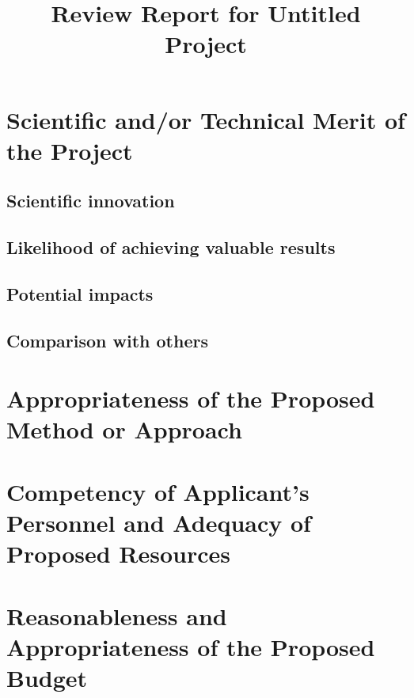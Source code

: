 \documentclass[11pt,a4paper,final]{article}
\title{Review Report for Untitled Project}
\date{}
\begin{document}
\maketitle

\section{Scientific and/or Technical Merit of the Project}

\begin{mdframed}
\subsection{Scientific innovation}

\subsection{Likelihood of achieving valuable results}

\subsection{Potential impacts}

\subsection{Comparison with others}

\end{mdframed}

\section{Appropriateness of the Proposed Method or Approach}
\begin{mdframed}
    
\end{mdframed}

\section{Competency of Applicant’s Personnel and Adequacy of Proposed Resources}
\begin{mdframed}
    
\end{mdframed}
\section{Reasonableness and Appropriateness of the Proposed Budget}
\begin{mdframed}
    
\end{mdframed}
\end{document}
